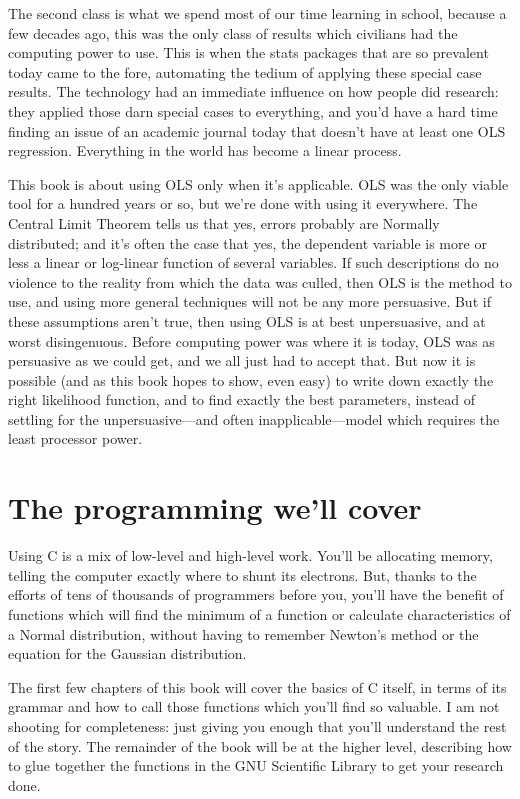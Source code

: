 \documentclass[12pt,notitlepage, openany]{book}
\begin{document}
The second class is what we spend most of our time learning in school,
because a few decades ago, this was the only class of results which
civilians had the computing power to use. This is when the stats packages
that are so prevalent today came to the fore, automating the tedium of
applying these special case results. The technology had an immediate
influence on how people did research: they applied those darn special
cases to everything, and you'd have a hard time finding an issue of an
academic journal today that doesn't have at least one OLS regression.
Everything in the world has become a linear process.

This book is about using OLS only when it's applicable. OLS was the only
viable tool for a hundred years or so, but we're done with using it everywhere.
The Central Limit Theorem tells us that yes, errors probably are
Normally distributed; and it's often the case that yes, the dependent
variable is more or less a linear or log-linear function of several
variables. If such descriptions do no violence to the reality from
which the data was culled, then OLS is the method to use, and using
more general techniques will not be any more persuasive. But if these
assumptions aren't true, then using OLS is at best unpersuasive, and at
worst disingenuous. Before computing power was where it is today, OLS was
as persuasive as we could get, and we all just had to accept that. But
now it is possible (and as this book hopes to show, even easy) to write
down exactly the right likelihood function, and to find exactly the best
parameters, instead of settling for the unpersuasive---and often
inapplicable---model which requires the least processor power.

\section{The programming we'll cover}

Using C is a mix of low-level and high-level
work. You'll be allocating memory, telling the computer exactly where
to shunt its electrons. But, thanks to the efforts of tens of thousands
of programmers before you, you'll have the benefit of functions which
will find the minimum of a function or calculate characteristics of a
Normal distribution, without having to remember Newton's method or
the equation for the Gaussian distribution.

The first few chapters of this book will cover the basics of C itself,
in terms of its grammar and how to call those functions which
you'll find so valuable. I am not shooting for completeness: just giving you enough that you'll
understand the rest of the story.  The remainder of the book will be at the higher
level, describing how to glue together the functions in the
GNU Scientific Library to get your research done.
\end{document}
